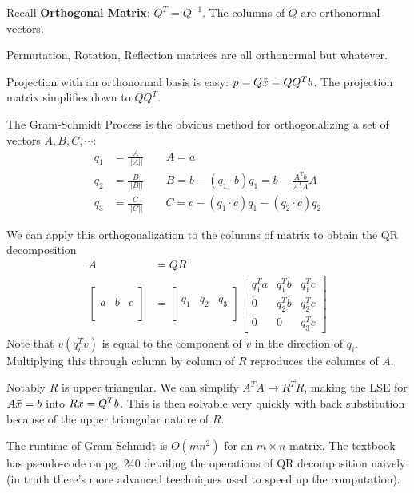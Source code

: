 \documentclass[12pt]{article} %
\begin{document}
Recall \textbf{Orthogonal Matrix}: $Q^T = Q^{-1}$. The columns of $Q$ are orthonormal vectors.

Permutation, Rotation, Reflection matrices are all orthonormal but whatever.

Projection with an orthonormal basis is easy: $p = Q\Tilde{x} = QQ^Tb$. The projection matrix simplifies down to $QQ^T$.

The Gram-Schmidt Process is the obvious method for orthogonalizing a set of vectors $A,B,C,\cdots$:
\begin{align*}
    q_1 &= \frac{A}{||A||} \qquad  A = a\\
    q_2 &= \frac{B}{||B||} \qquad  B = b - (q_1 \cdot b) q_1 = b - \frac{A^Tb}{A^TA}A \\
    q_3 &= \frac{C}{||C||} \qquad  C = c - (q_1 \cdot c) q_1 - (q_2 \cdot c) q_2
\end{align*}

We can apply this orthogonalization to the columns of matrix to obtain the QR decomposition
\begin{align*}
    A &= QR \\
    \begin{bmatrix}
    & & \\
    a & b & c \\
    & & \\
    \end{bmatrix}
    &=
    \begin{bmatrix}
    & & \\
    q_1 & q_2 & q_3 \\
    & & \\
    \end{bmatrix}
    \begin{bmatrix}
    q_1^Ta & q_1^Tb & q_1^Tc \\
    0 & q_2^Tb & q_2^Tc \\
    0 & 0 & q_3^Tc
    \end{bmatrix}
\end{align*}
Note that $v(q_i^Tv)$ is equal to the component of $v$ in the direction of $q_i$. Multiplying this through column by column of $R$ reproduces the columns of $A$.

Notably $R$ is upper triangular. We can simplify $A^TA \rightarrow R^T R$, making the LSE for $A\Tilde{x} = b$ into $R\Tilde{x} = Q^Tb$. This is then solvable very quickly with back substitution because of the upper triangular nature of $R$. 

The runtime of Gram-Schmidt is \href{https://stackoverflow.com/questions/27986225/computational-complexity-of-gram-schmidt-orthogonalization-algorithm}{$O(mn^2)$} for an $m \times n$ matrix. The textbook has pseudo-code on pg. 240 detailing the operations of QR decomposition naively (in truth there's more advanced teechniques used to speed up the computation).
\end{document}
